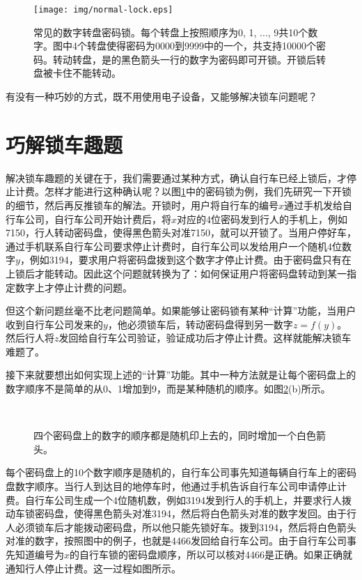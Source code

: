\documentclass[UTF8]{article}
\begin{document}
\begin{figure}[htbp]
  \centering
  \texttt{[image: img/normal-lock.eps]}
  \caption{常见的数字转盘密码锁。每个转盘上按照顺序为0, 1, ..., 9共10个数字。图中4个转盘使得密码为0000到9999中的一个，共支持10000个密码。转动转盘，是的黑色箭头一行的数字为密码即可开锁。开锁后转盘被卡住不能转动。}
  \label{fig:normal-lock}
\end{figure}


有没有一种巧妙的方式，既不用使用电子设备，又能够解决锁车问题呢？

\section{巧解锁车趣题}

解决锁车趣题的关键在于，我们需要通过某种方式，确认自行车已经上锁后，才停止计费。怎样才能进行这种确认呢？以图\ref{fig:normal-lock}中的密码锁为例，我们先研究一下开锁的细节，然后再反推锁车的解法。开锁时，用户将自行车的编号$x$通过手机发给自行车公司，自行车公司开始计费后，将$x$对应的4位密码发到行人的手机上，例如7150，行人转动密码盘，使得黑色箭头对准7150，就可以开锁了。当用户停好车，通过手机联系自行车公司要求停止计费时，自行车公司以发给用户一个随机4位数字$y$，例如3194，要求用户将密码盘拨到这个数字才停止计费。由于密码盘只有在上锁后才能转动。因此这个问题就转换为了：如何保证用户将密码盘转动到某一指定数字上才停止计费的问题。

但这个新问题丝毫不比老问题简单。如果能够让密码锁有某种“计算”功能，当用户收到自行车公司发来的$y$，他必须锁车后，转动密码盘得到另一数字$z=f(y)$。然后行人将$z$发回给自行车公司验证，验证成功后才停止计费。这样就能解决锁车难题了。

接下来就要想出如何实现上述的“计算”功能。其中一种方法就是让每个密码盘上的数字顺序不是简单的从0、1增加到9，而是某种随机的顺序。如图\ref{fig:random-lock}(b)所示。

\begin{figure}[htbp]
  \centering
   \\
  \caption{四个密码盘上的数字的顺序都是随机印上去的，同时增加一个白色箭头。}
  \label{fig:random-lock}
\end{figure}

每个密码盘上的10个数字顺序是随机的，自行车公司事先知道每辆自行车上的密码盘数字顺序。当行人到达目的地停车时，他通过手机告诉自行车公司申请停止计费。自行车公司生成一个4位随机数，例如3194发到行人的手机上，并要求行人拨动车锁密码盘，使得黑色箭头对准3194，然后将白色箭头对准的数字发回。由于行人必须锁车后才能拨动密码盘，所以他只能先锁好车。拨到3194，然后将白色箭头对准的数字，按照图中的例子，也就是4466发回给自行车公司。由于自行车公司事先知道编号为$x$的自行车锁的密码盘顺序，所以可以核对4466是正确。如果正确就通知行人停止计费。这一过程如图所示。
\end{document}
